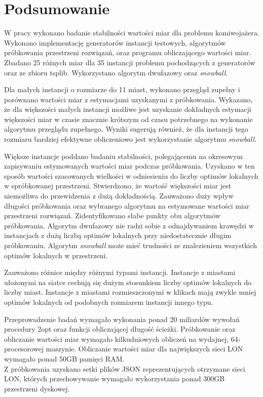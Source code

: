 \chapter{Podsumowanie}

W pracy wykonano badanie stabilności wartości miar dla problemu komiwojażera.
Wykonano implementację generatorów instancji testowych, algorytmów próbkowania przestrzeni rozwiązań,
oraz programu obliczającego wartości miar.
Zbadano 25 różnych miar dla 35 instancji problemu pochodzących z generatorów oraz ze zbioru tsplib.
Wykorzystano algorytm dwufazowy oraz \textit{snowball}.

Dla małych instancji o rozmiarze do 11 miast, wykonano przegląd zupełny i porównano wartości miar z estymacjami uzyskanymi
z próbkowania. Wykazano, że dla większości małych instancji możliwe jest uzyskanie dokładnych estymacji
większości miar w czasie znacznie krótszym od czasu potrzebnego na wykonanie algorytmu przeglądu zupełnego.
Wyniki sugerują również, że dla instancji tego rozmiaru bardziej efektywne obliczeniowo jest wykorzystanie
algorytmu \textit{snowball}.

Większe instancje poddano badaniu stabilności, polegającemu na okresowym zapisywaniu estymowanych wartości miar
podczas próbkowania. Uzyskano w ten sposób wartości szacowanych wielkości w odniesieniu do liczby optimów lokalnych w spróbkowanej przestrzeni.
Stwierdzono, że wartość większości miar jest niemożliwa do przewidzenia z dużą dokładnością.
Zauważono duży wpływ długości próbkowania oraz wybranego algorytmu na estymowane wartości miar przestrzeni rozwiązań.
Zidentyfikowano słabe punkty obu algorytmów próbkowania.
Algorytm dwufazowy nie radzi sobie z odnajdywaniem krawędzi w instancjach z dużą liczbą optimów lokalnych przy niedostatecznie długim próbkowaniu.
Algorytm \textit{snowball} może mieć trudności ze znalezieniem wszystkich optimów lokalnych w przestrzeni.

Zauważono różnice między różnymi typami instancji.
Instancje z miastami ułożonymi na siatce cechują się dużym stosunkiem liczby optimów lokalnych do liczby miast.
Instancje z miastami rozmieszczonymi w klikach mają zwykle mniej optimów lokalnych od podobnych rozmiarem instancji innego typu.

Przeprowadzenie badań wymagało wykonania ponad 20 miliardów wywołań procedury 2opt oraz funkcji obliczającej długość ścieżki.
Próbkowanie oraz obliczanie wartości miar wymagało kilkudniowych obliczeń
na wydajnej, 64-procesorowej maszynie. Obliczanie wartości miar dla największych sieci LON wymagało ponad 50GB pamięci RAM. \\
Z próbkowania uzyskano setki plików JSON reprezentujących otrzymane sieci LON, których przechowywanie wymagało wykorzystania ponad 300GB przestrzeni dyskowej.

